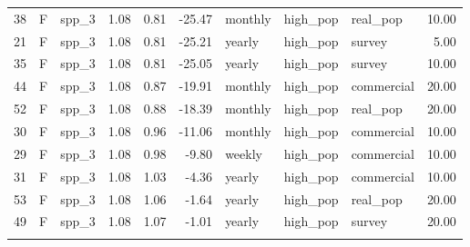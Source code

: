 \begin{longtable}{rllrrrlllr}
   38 & F & spp\_3 & 1.08 & 0.81 & -25.47 & monthly & high\_pop & real\_pop & 10.00 \\ 
   21 & F & spp\_3 & 1.08 & 0.81 & -25.21 & yearly & high\_pop & survey & 5.00 \\ 
   35 & F & spp\_3 & 1.08 & 0.81 & -25.05 & yearly & high\_pop & survey & 10.00 \\ 
   44 & F & spp\_3 & 1.08 & 0.87 & -19.91 & monthly & high\_pop & commercial & 20.00 \\ 
   52 & F & spp\_3 & 1.08 & 0.88 & -18.39 & monthly & high\_pop & real\_pop & 20.00 \\ 
   30 & F & spp\_3 & 1.08 & 0.96 & -11.06 & monthly & high\_pop & commercial & 10.00 \\ 
   29 & F & spp\_3 & 1.08 & 0.98 & -9.80 & weekly & high\_pop & commercial & 10.00 \\ 
   31 & F & spp\_3 & 1.08 & 1.03 & -4.36 & yearly & high\_pop & commercial & 10.00 \\ 
   53 & F & spp\_3 & 1.08 & 1.06 & -1.64 & yearly & high\_pop & real\_pop & 20.00 \\ 
   49 & F & spp\_3 & 1.08 & 1.07 & -1.01 & yearly & high\_pop & survey & 20.00 \\ 
   \hline
\hline
\label{tab:6}
\end{longtable}
